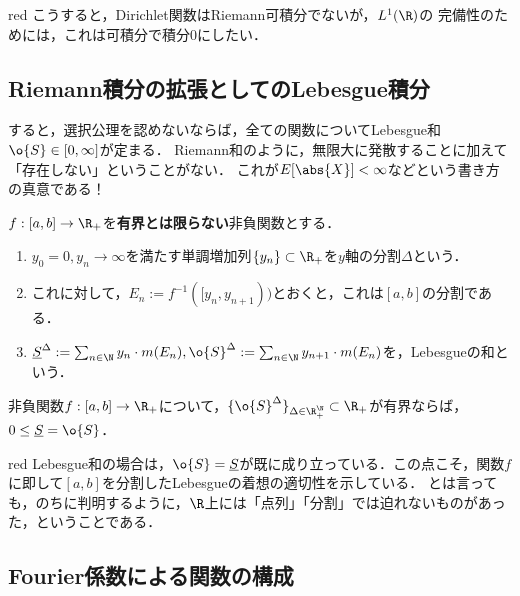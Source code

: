 \documentclass[uplatex, dvipdfmx]{jsreport}
\begin{document}
\begin{tbox}{red}{}
    こうすると，Dirichlet関数はRiemann可積分でないが，$L^1(\R)$の
    完備性のためには，これは可積分で積分$0$にしたい．
\end{tbox}

\subsection{Riemann積分の拡張としてのLebesgue積分}

\begin{tcolorbox}[colframe=ForestGreen, colback=ForestGreen!10!white,breakable,colbacktitle=ForestGreen!40!white,coltitle=black,fonttitle=\bfseries\sffamily,
title=]
    すると，選択公理を認めないならば，全ての関数についてLebesgue和$\o{S}\in[0,\infty]$が定まる．
    Riemann和のように，無限大に発散することに加えて「存在しない」ということがない．
    これが$E[\abs{X}]<\infty$などという書き方の真意である！
\end{tcolorbox}

\begin{notation}
    $f:[a,b]\to\R_+$を\textbf{有界とは限らない}非負関数とする．
    \begin{enumerate}
        \item $y_0=0,y_n\to\infty$を満たす単調増加列$\{y_n\}\subset\R_+$を$y$軸の分割$\Delta$という．
        \item これに対して，$E_n:=f^{-1}([y_n,y_{n+1}))$とおくと，これは$[a,b]$の分割である．
        \item $\underline{S}^\Delta:=\sum_{n\in\N}y_n\cdot m(E_n),\o{S}^\Delta:=\sum_{n\in\N}y_{n+1}\cdot m(E_n)$を，Lebesgueの和という．
    \end{enumerate}
\end{notation}

\begin{theorem}
    非負関数$f:[a,b]\to\R_+$について，$\{\o{S}^\Delta\}_{\Delta\in\R_+^\N}\subset\R_+$が有界ならば，$0\le \underline{S}=\o{S}$．
\end{theorem}

\begin{tbox}{red}{}
    Lebesgue和の場合は，$\o{S}=\underline{S}$が既に成り立っている．この点こそ，関数$f$に即して$[a,b]$を分割したLebesgueの着想の適切性を示している．
    とは言っても，のちに判明するように，$\R$上には「点列」「分割」では迫れないものがあった，ということである．
\end{tbox}

\subsection{Fourier係数による関数の構成}
\end{document}
